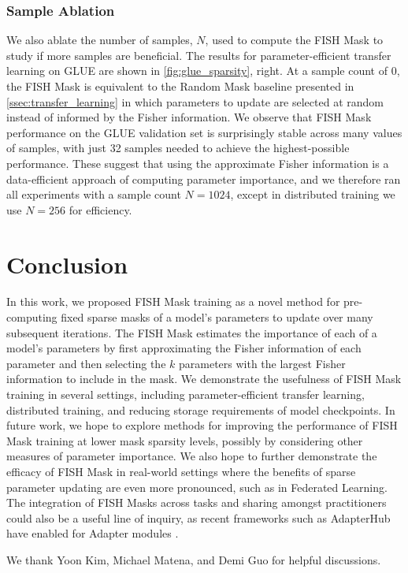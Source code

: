 \subsubsection{Sample Ablation}
\label{sec:ablation}

We also ablate the number of samples, $N$, used to compute the FISH Mask to study if more samples are beneficial. The results for parameter-efficient transfer learning on GLUE are shown in \ref{fig:glue_sparsity}, right. At a sample count of 0, the FISH Mask is equivalent to the Random Mask baseline presented in \ref{ssec:transfer_learning} in which parameters to update are selected at random instead of informed by the Fisher information. We observe that FISH Mask performance on the GLUE validation set is surprisingly stable across many values of samples, with just 32 samples needed to achieve the highest-possible performance. These suggest that using the approximate Fisher information is a data-efficient approach of computing parameter importance, and we therefore ran all experiments with a sample count $N = 1024$, except in distributed training we use $N = 256$ for efficiency.

\section{Conclusion}

In this work, we proposed FISH Mask training as a novel method for pre-computing fixed sparse masks of a model's parameters to update over many subsequent iterations. The FISH Mask estimates the importance of each of a model's parameters by first approximating the Fisher information of each parameter and then selecting the $k$ parameters with the largest Fisher information to include in the mask. We demonstrate the usefulness of FISH Mask training in several settings, including parameter-efficient transfer learning, distributed training, and reducing storage requirements of model checkpoints. In future work, we hope to explore methods for improving the performance of FISH Mask training at lower mask sparsity levels, possibly by considering other measures of parameter importance. We also hope to further demonstrate the efficacy of FISH Mask in real-world settings where the benefits of sparse parameter updating are even more pronounced, such as in Federated Learning. The integration of FISH Masks across tasks and sharing amongst practitioners could also be a useful line of inquiry, as recent frameworks such as AdapterHub \citep{DBLP:journals/corr/abs-2007-07779} have enabled for Adapter modules \citep{DBLP:journals/corr/abs-1902-00751}.

\begin{ack}
We thank Yoon Kim, Michael Matena, and Demi Guo for helpful discussions.

\end{ack}


